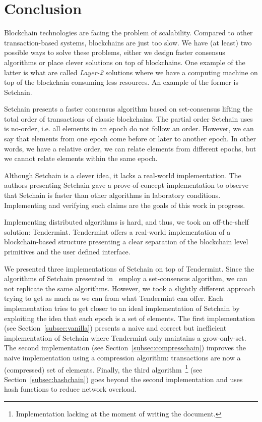 \section{Conclusion}\label{sec:conclusion}
%
Blockchain technologies are facing the problem of scalability.
%
Compared to other transaction-based systems, blockchains are just too slow.
%
We have (at least) two possible ways to solve these problems, either we design
faster consensus algorithms or place clever solutions on top of blockchains.
%
One example of the latter is what are called \emph{Layer-2} solutions where we
have a computing machine on top of the blockchain consuming less resources.
%
An example of the former is Setchain.

Setchain presents a faster consensus algorithm based on set-consensus lifting
the total order of transactions of classic blockchains.
%
The partial order Setchain uses is no-order, i.e. all elements in an epoch do
not follow an order.
%
However, we can say that elements from one epoch come before or later to another
epoch.
%
In other words, we have a relative order, we can relate elements from different
epochs, but we cannot relate elements within the same epoch.

Although Setchain is a clever idea, it lacks a real-world implementation.
%
The authors presenting Setchain gave a prove-of-concept implementation to
observe that Setchain is faster than other algorithms in laboratory conditions.
%
Implementing and verifying such claims are the goals of this work in progress.

Implementing distributed algorithms is hard, and thus, we took an off-the-shelf
solution: Tendermint.
%
Tendermint offers a real-world implementation of a blockchain-based structure
presenting a clear separation of the blockchain level primitives and the user
defined interface.

We presented three implementations of Setchain on top of Tendermint.
%
Since the algorithms of Setchain presented in~\cite{Capretto.2022.Setchain}
employ a set-consensus algorithm, we can not replicate the same algorithms.
%
However, we took a slightly different approach trying to get as much as we can
from what Tendermint can offer.
%
Each implementation tries to get closer to an ideal implementation of Setchain
by exploiting the idea that each epoch is a set of elements.
%
The first implementation (see Section~\ref{subsec:vanilla}) presents a naive and
correct but inefficient implementation of Setchain where Tendermint only
maintains a grow-only-set.
%
The second implementation (see Section~\ref{subsec:compresschain}) improves the
naive implementation using a compression algorithm: transactions are now a
(compressed) set of elements.
%
Finally, the third algorithm~\footnote{Implementation lacking at the moment of
writing the document.} (see Section~\ref{subsec:hashchain}) goes beyond the
second implementation and uses hash functions to reduce network overload.

